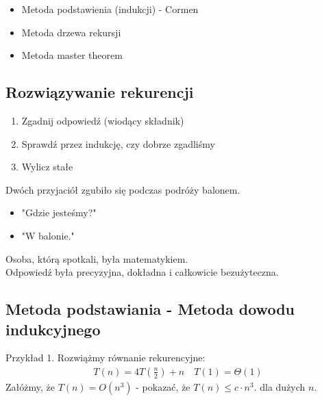 \documentclass{article}
\numberwithin{equation}{subsection}
\newenvironment{information}[1]{%
    \trivlist
    \item[\hskip\labelsep\textbf{Information. #1.}]
    \ignorespaces
}{%
    \endtrivlist
}
\begin{document}
\begin{itemize}
    \item Metoda podstawienia (indukcji) - Cormen
    \item Metoda drzewa rekursji
    \item Metoda master theorem
\end{itemize}

\subsection{Rozwiązywanie rekurencji}

\begin{enumerate}
    \item Zgadnij odpowiedź (wiodący składnik)
    \item Sprawdź przez indukcję, czy dobrze zgadliśmy
    \item Wylicz stałe
\end{enumerate}

\begin{information}{Historyjka}
    Dwóch przyjaciół zgubiło się podczas podróży balonem.
    \begin{itemize}
        \item "Gdzie jesteśmy?"
        \item "W balonie."
    \end{itemize}
    Osoba, którą spotkali, była matematykiem.\\ Odpowiedź była precyzyjna, dokładna i całkowicie bezużyteczna.
\end{information}

\subsection{Metoda podstawiania - Metoda dowodu indukcyjnego}

Przykład 1. Rozwiążmy równanie rekurencyjne:
\begin{align}
    T(n) = 4T\left(\frac{n}{2}\right) + n \quad T(1) = \Theta(1)
\end{align}
Załóżmy, że $T(n)=O(n^3)$ - pokazać, że $T(n)\leq c\cdot n^3$. dla dużych $n$. 
\end{document}
